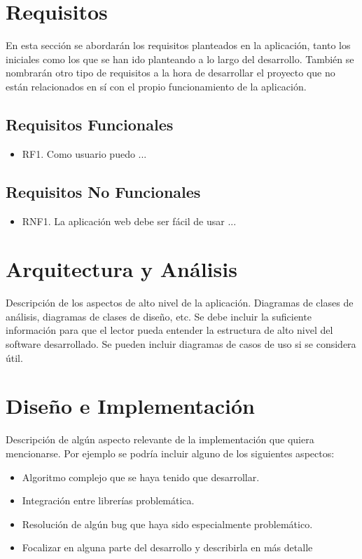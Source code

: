 \section{Requisitos}
En esta sección se abordarán los requisitos planteados en la aplicación, tanto los iniciales como los que se han ido planteando a lo largo del desarrollo. 
También se nombrarán otro tipo de requisitos a la hora de desarrollar el proyecto que no están relacionados en sí con el propio funcionamiento de la aplicación.

\subsection{Requisitos Funcionales}

\begin{itemize}
    \item RF1. Como usuario puedo ...
\end{itemize}

\subsection{Requisitos No Funcionales}

\begin{itemize}
    \item RNF1. La aplicación web debe ser fácil de usar ...
\end{itemize}

\section{Arquitectura y Análisis}

Descripción de los aspectos de alto nivel de la aplicación. Diagramas de clases de análisis, diagramas de clases de diseño, etc. Se debe incluir la suficiente información para que el lector pueda entender la estructura de alto nivel del software desarrollado. Se pueden incluir diagramas de casos de uso si se considera útil.

\section{Diseño e Implementación} 

Descripción de algún aspecto relevante de la implementación que quiera mencionarse. Por ejemplo se podría incluir alguno de los siguientes aspectos:
\begin{itemize}
    \item Algoritmo complejo que se haya tenido que desarrollar.
    \item Integración entre librerías problemática.
    \item Resolución de algún bug que haya sido especialmente problemático.
    \item Focalizar en alguna parte del desarrollo y describirla en más detalle
\end{itemize}

